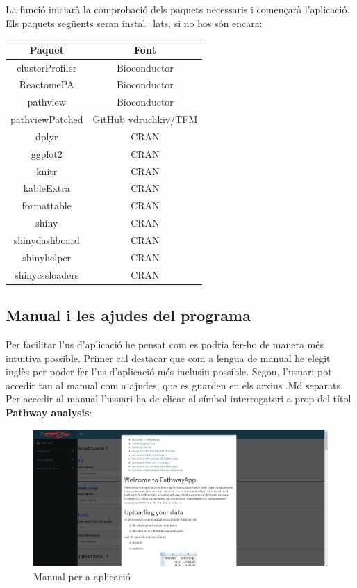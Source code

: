 \documentclass[]{article}
\begin{document}
La funció  iniciarà la comprobació dels paquets necessaris i començarà l'aplicació. Els paquets següents seran instal·lats, si no hos són encara:

\begin{center}
\begin{tabular}{||c | c ||} 
\hline\hline 
\textbf{Paquet} & \textbf{Font} \\ [0.5ex] 
\hline\hline
clusterProfiler & Bioconductor \\
\hline
ReactomePA & Bioconductor \\
\hline
pathview & Bioconductor \\ 
\hline
pathviewPatched & GitHub vdruchkiv/TFM\\
\hline
dplyr & CRAN \\
\hline 
ggplot2 & CRAN \\
\hline
knitr & CRAN \\
\hline
kableExtra & CRAN \\
\hline
formattable & CRAN \\
\hline
shiny & CRAN \\
\hline 
shinydashboard & CRAN \\ 
\hline
shinyhelper & CRAN \\
\hline 
shinycssloaders & CRAN\\
\hline\hline
\end{tabular}
\end{center}

\subsection{Manual i les ajudes del programa}

Per facilitar l'us d'aplicació he pensat com es podria fer-ho de manera més intuitiva possible. Primer cal destacar que com a lengua de manual he elegit inglès per poder fer l'us d'aplicació més inclusiu possible. Segon, l'usuari pot accedir tan al manual com a ajudes, que es guarden en els arxius .Md separats. Per accedir al manual l'usuari ha de clicar al símbol interrogatori a prop del títol \textbf{Pathway analysis}:
\begin{figure}[H]
\centering
\includegraphics[width=1\textwidth]{Manual.jpg} 
\caption{Manual per a aplicació}
\end{figure}
\end{document}
